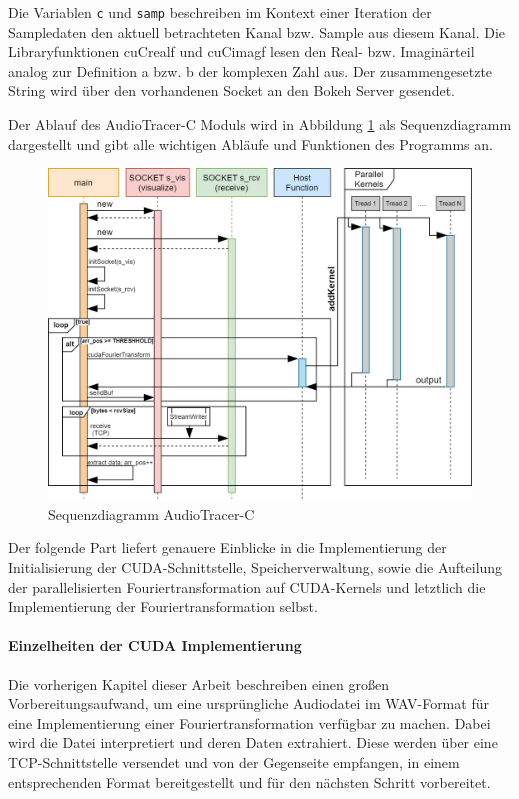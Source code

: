 Die Variablen \texttt{c} und \texttt{samp} beschreiben im Kontext einer Iteration der Sampledaten den aktuell betrachteten Kanal bzw. Sample aus diesem Kanal. Die Libraryfunktionen cuCrealf und cuCimagf lesen den Real- bzw. Imaginärteil analog zur Definition a bzw. b der komplexen Zahl aus. Der zusammengesetzte String wird über den vorhandenen Socket an den Bokeh Server gesendet.

Der Ablauf des AudioTracer-C Moduls wird in Abbildung \ref{fig:Seq_AudioTracer} als Sequenzdiagramm dargestellt und gibt alle wichtigen Abläufe und Funktionen des Programms an.

\begin{figure}[hbt!]
	\centering      
	\includegraphics[scale=0.46, angle=-90]{figures/AudioTracerC++_sequence_diagram.png}
	\caption{Sequenzdiagramm AudioTracer-C}
	\label{fig:Seq_AudioTracer}
\end{figure}

\clearpage

Der folgende Part liefert genauere Einblicke in die Implementierung der Initialisierung der CUDA-Schnittstelle, Speicherverwaltung, sowie die Aufteilung der parallelisierten Fouriertransformation auf CUDA-Kernels und letztlich die Implementierung der Fouriertransformation selbst.

\paragraph{Einzelheiten der CUDA Implementierung}
Die vorherigen Kapitel dieser Arbeit beschreiben einen großen Vorbereitungsaufwand, um eine ursprüngliche Audiodatei im WAV-Format für eine Implementierung einer Fouriertransformation verfügbar zu machen. Dabei wird die Datei interpretiert und deren Daten extrahiert. Diese werden über eine TCP-Schnittstelle versendet und von der Gegenseite empfangen, in einem entsprechenden Format bereitgestellt und für den nächsten Schritt vorbereitet.


